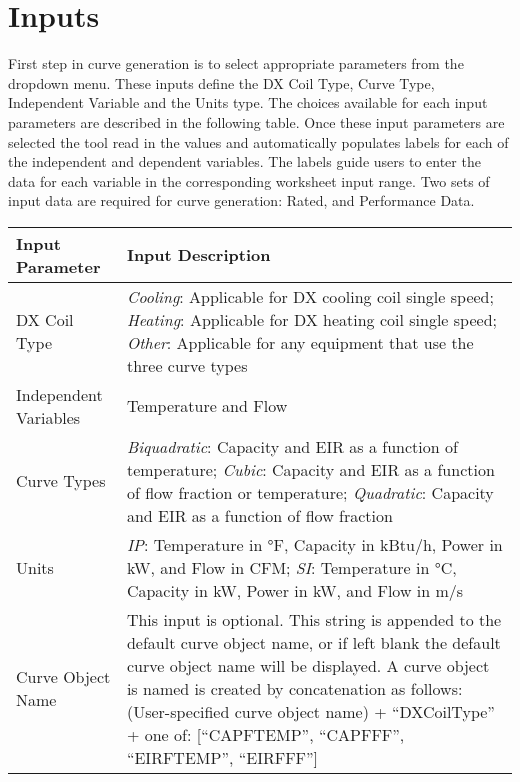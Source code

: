 \section{Inputs}\label{inputs}

First step in curve generation is to select appropriate parameters from the dropdown menu. These inputs define the DX Coil Type, Curve Type, Independent Variable and the Units type. The choices available for each input parameters are described in the following table. Once these input parameters are selected the tool read in the values and automatically populates labels for each of the independent and dependent variables. The labels guide users to enter the data for each variable in the corresponding worksheet input range. Two sets of input data are required for curve generation: Rated, and Performance Data.

\begin{longtable}{p{2in}|p{4in}}
\toprule
Input Parameter & Input Description \tabularnewline \midrule
\endhead 
DX Coil Type & \emph{Cooling}: Applicable for DX cooling coil single speed; 
               \emph{Heating}: Applicable for DX heating coil single speed; 
               \emph{Other}: Applicable for any equipment that use the three curve types
\tabularnewline
Independent Variables & Temperature and Flow 
\tabularnewline
Curve Types & \emph{Biquadratic}: Capacity and EIR as a function of temperature;
              \emph{Cubic}: Capacity and EIR as a function of flow fraction or temperature;
              \emph{Quadratic}: Capacity and EIR as a function of flow fraction
\tabularnewline
Units & \emph{IP}: Temperature in °F, Capacity in kBtu/h, Power in kW, and Flow in CFM;
        \emph{SI}: Temperature in °C, Capacity in kW, Power in kW, and Flow in m/s 
\tabularnewline
Curve Object Name & This input is optional. This string is appended to the default curve object name, or if left blank the default curve object name will be displayed. A curve object is named is created by concatenation as follows: (User-specified curve object name) + ``DXCoilType'' + one of: [``CAPFTEMP'', ``CAPFFF'', ``EIRFTEMP'', ``EIRFFF'']\tabularnewline
\bottomrule
\end{longtable}

